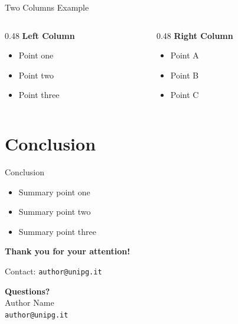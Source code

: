 \documentclass[aspectratio=169]{beamer}
\begin{document}
\begin{frame}{Two Columns Example}
    \begin{columns}[T]
        \begin{column}{0.48\textwidth}
            \textbf{Left Column}
            \begin{itemize}
                \item Point one
                \item Point two
                \item Point three
            \end{itemize}
        \end{column}
        \begin{column}{0.48\textwidth}
            \textbf{Right Column}
            \begin{itemize}
                \item Point A
                \item Point B
                \item Point C
            \end{itemize}
        \end{column}
    \end{columns}
\end{frame}

\section{Conclusion}

\begin{frame}{Conclusion}
    \begin{itemize}
        \item Summary point one
        \item Summary point two
        \item Summary point three
    \end{itemize}
    \vspace{0.5cm}
    \textbf{Thank you for your attention!}
    \vspace{0.3cm}

    Contact: \texttt{author@unipg.it}
\end{frame}

\begin{frame}
    \vfill
    \begin{center}
        {\Large\textbf{Questions?}}\\[1cm]
        {\large Author Name}\\[0.2cm]
        \texttt{author@unipg.it}
    \end{center}
    \vfill
\end{frame}
\end{document}
